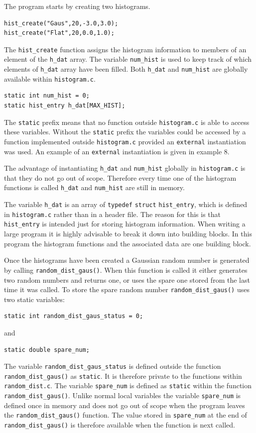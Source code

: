 \documentclass[11pt]{scrartcl}
\begin{document}
The program starts by creating two histograms.
\begin{lstlisting}
hist_create("Gaus",20,-3.0,3.0);
hist_create("Flat",20,0.0,1.0);
\end{lstlisting}
The \texttt{hist\_create} function assigns the histogram information
to members of an element of the \texttt{h\_dat} array.  The variable
\texttt{num\_hist} is used to keep track of which elements of
\texttt{h\_dat} array have been filled.  Both \texttt{h\_dat} and
\texttt{num\_hist} are globally available within
\texttt{histogram.c}.  
\begin{lstlisting}
static int num_hist = 0;
static hist_entry h_dat[MAX_HIST];
\end{lstlisting}
The \texttt{static} prefix means that no function outside
\texttt{histogram.c} is able to access these variables.  Without the 
\texttt{static} prefix the variables could be accessed by a function
implemented outside \texttt{histogram.c} provided an \texttt{external}
instantiation was used.  An example of an \texttt{external}
instantiation is given in example 8.

The advantage of instantiating \texttt{h\_dat} and
\texttt{num\_hist} globally in \texttt{histogram.c} is that they do
not go out of scope.  Therefore every time one of the histogram
functions is called \texttt{h\_dat} and
\texttt{num\_hist} are still in memory.

The variable \texttt{h\_dat} is an array of \texttt{typedef}
\texttt{struct} \texttt{hist\_entry}, which is defined in
\texttt{histogram.c} rather than in a header file.  The reason
for this is that \texttt{hist\_entry} is intended just for storing
histogram information.  When writing a large program it is highly
advisable to break it down into building blocks.  In this program the
histogram functions and the associated data are one building block.

Once the histograms have been created a Gaussian random number is
generated by calling \texttt{random\_dist\_gaus()}.  When this
function is called it either generates two random numbers and returns
one, or uses the spare one stored from the last time it was called.  To
store the spare random number \texttt{random\_dist\_gaus()} uses two
static variables:
\begin{lstlisting}
static int random_dist_gaus_status = 0;
\end{lstlisting}
and
\begin{lstlisting}
static double spare_num;
\end{lstlisting}
The variable \texttt{random\_dist\_gaus\_status} is defined outside
the function \texttt{random\_dist\_gaus()} as \texttt{static}.  It is
therefore private to the functions within \texttt{random\_dist.c}.
The variable \texttt{spare\_num} is defined as \texttt{static} within
the function \texttt{random\_dist\_gaus()}.  Unlike normal local
variables the variable \texttt{spare\_num} is defined once in memory
and does not go out of scope when the program leaves the
\texttt{random\_dist\_gaus()} function.  The value stored in
\texttt{spare\_num} at the end of \texttt{random\_dist\_gaus()} is
therefore available when the function is next called.
\end{document}
